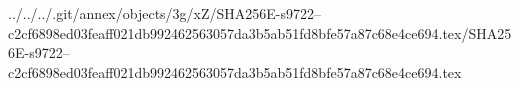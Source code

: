 ../../../.git/annex/objects/3g/xZ/SHA256E-s9722--c2cf6898ed03feaff021db992462563057da3b5ab51fd8bfe57a87c68e4ce694.tex/SHA256E-s9722--c2cf6898ed03feaff021db992462563057da3b5ab51fd8bfe57a87c68e4ce694.tex